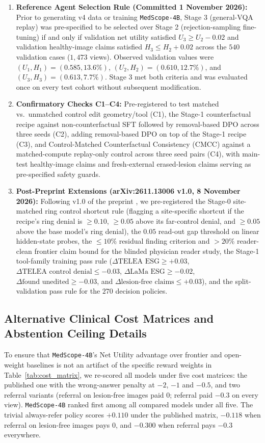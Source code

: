 \documentclass[10pt]{article}
\begin{document}
\begin{enumerate}[leftmargin=*,nosep]
    \item \textbf{Reference Agent Selection Rule (Committed 1 November 2026):} Prior to generating v4 data or training \texttt{MedScope-4B}, Stage 3 (general-VQA replay) was pre-specified to be selected over Stage 2 (rejection-sampling fine-tuning) if and only if validation net utility satisfied $U_3 \ge U_2 - 0.02$ and validation healthy-image claims satisfied $H_3 \le H_2 + 0.02$ across the $540$ validation cases ($1,473$ views). Observed validation values were $(U_1, H_1) = (0.585, 13.6\%)$, $(U_2, H_2) = (0.610, 12.7\%)$, and $(U_3, H_3) = (0.613, 7.7\%)$. Stage 3 met both criteria and was evaluated once on every test cohort without subsequent modification.
    \item \textbf{Confirmatory Checks C1--C4:} Pre-registered to test matched vs.\ unmatched control edit geometry/tool (C1), the Stage-1 counterfactual recipe against non-counterfactual SFT followed by removal-based DPO across three seeds (C2), adding removal-based DPO on top of the Stage-1 recipe (C3), and Control-Matched Counterfactual Consistency (CMCC) against a matched-compute replay-only control across three seed pairs (C4), with main-test healthy-image claims and fresh-external erased-lesion claims serving as pre-specified safety guards.
    \item \textbf{Post-Preprint Extensions (arXiv:2611.13006 v1.0, 8 November 2026):} Following v1.0 of the preprint \citep{gurram2026medscope}, we pre-registered the Stage-0 site-matched ring control shortcut rule (flagging a site-specific shortcut if the recipe's ring denial is $\ge 0.10$, $\ge 0.05$ above its far-control denial, and $\ge 0.05$ above the base model's ring denial), the $0.05$ read-out gap threshold on linear hidden-state probes, the $\le 10\%$ residual finding criterion and $>20\%$ reader-clean frontier claim bound for the blinded physician reader study, the Stage-1 tool-family training pass rule ($\Delta\text{TELEA ESG} \ge +0.03$, $\Delta\text{TELEA control denial} \le -0.03$, $\Delta\text{LaMa ESG} \ge -0.02$, $\Delta\text{found unedited} \ge -0.03$, and $\Delta\text{lesion-free claims} \le +0.03$), and the split-validation pass rule for the $270$ decision policies.
\end{enumerate}

\subsection{Alternative Clinical Cost Matrices and Abstention Ceiling Details}
To ensure that \texttt{MedScope-4B}'s Net Utility advantage over frontier and open-weight baselines is not an artifact of the specific reward weights in Table~\ref{tab:cost_matrix}, we re-scored all models under five cost matrices: the published one with the wrong-answer penalty at $-2$, $-1$ and $-0.5$, and two referral variants (referral on lesion-free images paid $0$; referral paid $-0.3$ on every view). \texttt{MedScope-4B} ranked first among all compared models under all five. The trivial always-refer policy scores $+0.110$ under the published matrix, $-0.118$ when referral on lesion-free images pays $0$, and $-0.300$ when referral pays $-0.3$ everywhere.
\end{document}
